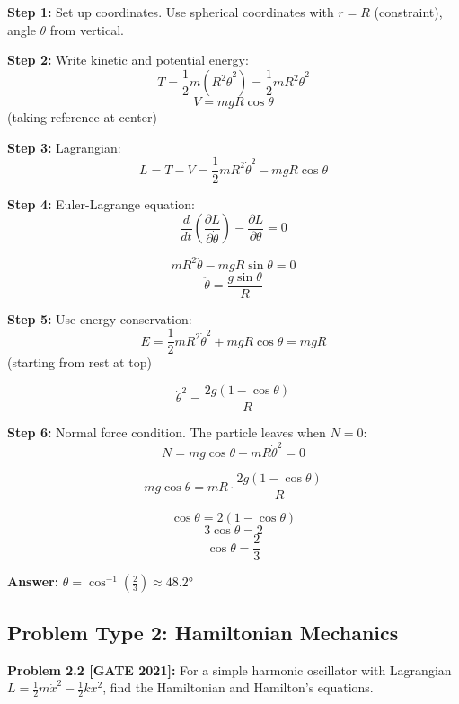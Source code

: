 \documentclass[12pt,a4paper]{article}
\begin{document}
\begin{solution}
\textbf{Step 1:} Set up coordinates. Use spherical coordinates with $r = R$ (constraint), angle $\theta$ from vertical.

\textbf{Step 2:} Write kinetic and potential energy:
$$T = \frac{1}{2}m(R^2\dot{\theta}^2) = \frac{1}{2}mR^2\dot{\theta}^2$$
$$V = mgR\cos\theta$$ (taking reference at center)

\textbf{Step 3:} Lagrangian:
$$L = T - V = \frac{1}{2}mR^2\dot{\theta}^2 - mgR\cos\theta$$

\textbf{Step 4:} Euler-Lagrange equation:
$$\frac{d}{dt}\left(\frac{\partial L}{\partial \dot{\theta}}\right) - \frac{\partial L}{\partial \theta} = 0$$

$$mR^2\ddot{\theta} - mgR\sin\theta = 0$$
$$\ddot{\theta} = \frac{g\sin\theta}{R}$$

\textbf{Step 5:} Use energy conservation:
$$E = \frac{1}{2}mR^2\dot{\theta}^2 + mgR\cos\theta = mgR$$ (starting from rest at top)

$$\dot{\theta}^2 = \frac{2g(1-\cos\theta)}{R}$$

\textbf{Step 6:} Normal force condition. The particle leaves when $N = 0$:
$$N = mg\cos\theta - mR\dot{\theta}^2 = 0$$

$$mg\cos\theta = mR \cdot \frac{2g(1-\cos\theta)}{R}$$

$$\cos\theta = 2(1-\cos\theta)$$
$$3\cos\theta = 2$$
$$\cos\theta = \frac{2}{3}$$

\textbf{Answer:} $\theta = \cos^{-1}\left(\frac{2}{3}\right) \approx 48.2°$
\end{solution}

\subsection{Problem Type 2: Hamiltonian Mechanics}

\textbf{Problem 2.2 [GATE 2021]:} For a simple harmonic oscillator with Lagrangian $L = \frac{1}{2}m\dot{x}^2 - \frac{1}{2}kx^2$, find the Hamiltonian and Hamilton's equations.
\end{document}
